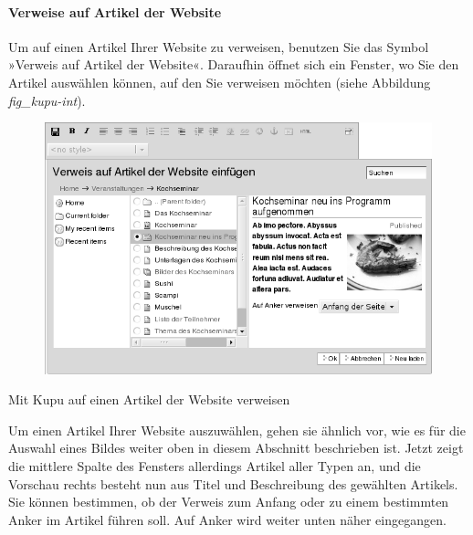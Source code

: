 \documentclass[a4paper,12pt,ngerman]{manual}
\begin{document}
\paragraph{Verweise auf Artikel der Website}

Um auf einen Artikel Ihrer Website zu verweisen, benutzen Sie das Symbol
»Verweis auf Artikel der Website«. Daraufhin öffnet sich ein Fenster, wo Sie
den Artikel auswählen können, auf den Sie verweisen möchten
(siehe Abbildung \emph{fig\_kupu-int}).
\hypertarget{fig-kupu-int}{}\begin{figure}[htbp]
\centering

\includegraphics{kupu-int.png}
\end{figure}

Mit Kupu auf einen Artikel der Website verweisen

Um einen Artikel Ihrer Website auszuwählen, gehen sie ähnlich vor, wie es für
die Auswahl eines Bildes weiter oben in diesem Abschnitt beschrieben ist.
Jetzt zeigt die mittlere Spalte des Fensters allerdings Artikel aller Typen
an, und die Vorschau rechts besteht nun aus Titel und Beschreibung des
gewählten Artikels. Sie können bestimmen, ob der Verweis zum Anfang oder zu
einem bestimmten Anker im Artikel führen soll. Auf Anker wird weiter unten
näher eingegangen.
\end{document}
